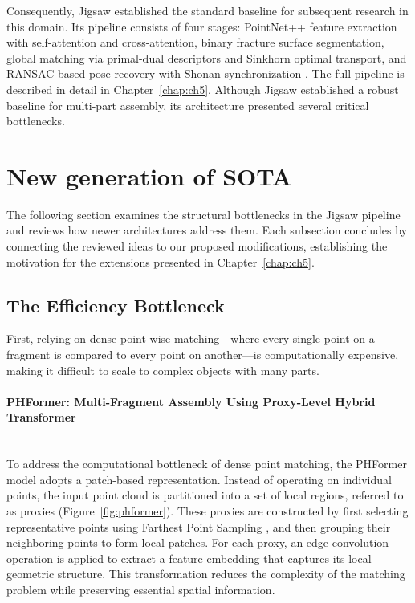Consequently, Jigsaw established the standard baseline for subsequent research in this domain. Its pipeline consists of four stages: PointNet++ feature extraction with self-attention and cross-attention, binary fracture surface segmentation, global matching via primal-dual descriptors and Sinkhorn optimal transport, and RANSAC-based pose recovery with Shonan synchronization \cite{lu2023jigsaw}. The full pipeline is described in detail in Chapter~\ref{chap:ch5}. Although Jigsaw established a robust baseline for multi-part assembly, its architecture presented several critical bottlenecks. 

\section{New generation of SOTA}

The following section examines the structural bottlenecks in the Jigsaw pipeline and reviews how newer architectures address them. Each subsection concludes by connecting the reviewed ideas to our proposed modifications, establishing the motivation for the extensions presented in Chapter~\ref{chap:ch5}.

\subsection{The Efficiency Bottleneck}

First, relying on dense point-wise matching—where every single point on a fragment is compared to every point on another—is computationally expensive, making it difficult to scale to complex objects with many parts.

\paragraph{PHFormer: Multi-Fragment Assembly Using Proxy-Level Hybrid Transformer} \mbox{} \\
To address the computational bottleneck of dense point matching, the PHFormer \cite{cui2024phformer} model adopts a patch-based representation. Instead of operating on individual points, the input point cloud is partitioned into a set of local regions, referred to as proxies (Figure~\ref{fig:phformer}). These proxies are constructed by first selecting representative points using Farthest Point Sampling \cite{qi2017pointnetplusplus}, and then grouping their neighboring points to form local patches. For each proxy, an edge convolution operation is applied to extract a feature embedding that captures its local geometric structure. This transformation reduces the complexity of the matching problem while preserving essential spatial information.

